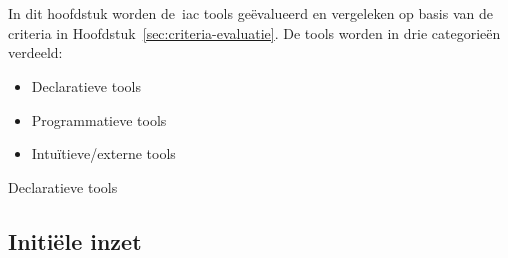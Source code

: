 
\chapter{}
\label{ch:vergelijking}

In dit hoofdstuk worden de~\acrshort{iac} tools geëvalueerd en vergeleken op basis van de criteria in Hoofdstuk~\ref{sec:criteria-evaluatie}.
De tools worden in drie categorieën verdeeld:

\begin{itemize}
    \item Declaratieve tools
    \item Programmatieve tools
    \item Intuïtieve/externe tools
\end{itemize}

Declaratieve tools


\section{Initiële inzet}
\label{subsec:eval-initiele-inzet}



